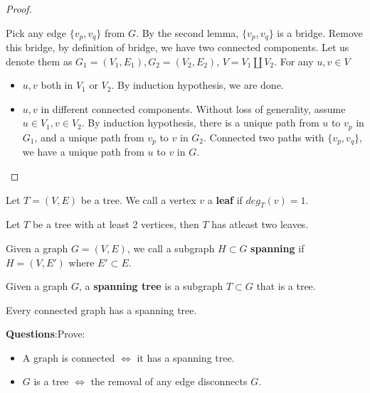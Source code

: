 \begin{proof}
\begin{enumerate}
        Pick any edge $\{v_p,v_q\}$ from $G$. 
        By the second lemma, $\{v_p,v_q\}$ is a bridge. 
        Remove this bridge, by definition of bridge, we have two connected components. 
        Let us denote them as $G_1=(V_1,E_1),G_2=(V_2,E_2)$, $V=V_1 \coprod V_2$. 
        For any $u,v \in V$
        \begin{itemize}
            \item $u,v$ both in $V_1$ or $V_2$. By induction hypothesis, we are done.
            \item $u,v$ in different connected components. Without loss of generality, assume $u \in V_1,v \in V_2$. 
            By induction hypothesis, there is a unique path from $u$ to $v_p$ in $G_1$, and a unique path from $v_p$ to $v$ in $G_2$. 
            Connected two paths with $\{v_p,v_q\}$, we have a unique path from $u$ to $v$ in $G$.
        \end{itemize}
    \end{enumerate}
\end{proof}


\begin{definition}
    Let $T=(V,E)$ be a tree. We call a vertex $v$ a \textbf{leaf} if $deg_T(v)=1$.
\end{definition}

\begin{lemma}
    Let $T$ be a tree with at least 2 vertices, then $T$ has atleast two leaves.
\end{lemma}

\begin{definition}
    Given a graph $G=(V,E)$, we call a subgraph $H \subset G$ \textbf{spanning} if $H=(V,E')$ where $E' \subset E$.
\end{definition}

\begin{definition}
    Given a graph $G$, a \textbf{spanning tree} is a subgraph $T \subset G$ that is a tree.
\end{definition}

\begin{theorem}
    Every connected graph has a spanning tree.
\end{theorem}

\noindent \textbf{Questions}:Prove:
\begin{itemize}
    \item A graph is connected $\Longleftrightarrow$ it has a spanning tree.
    \item $G$ is a tree $\Longleftrightarrow$ the removal of any edge disconnects $G$.
\end{itemize}

